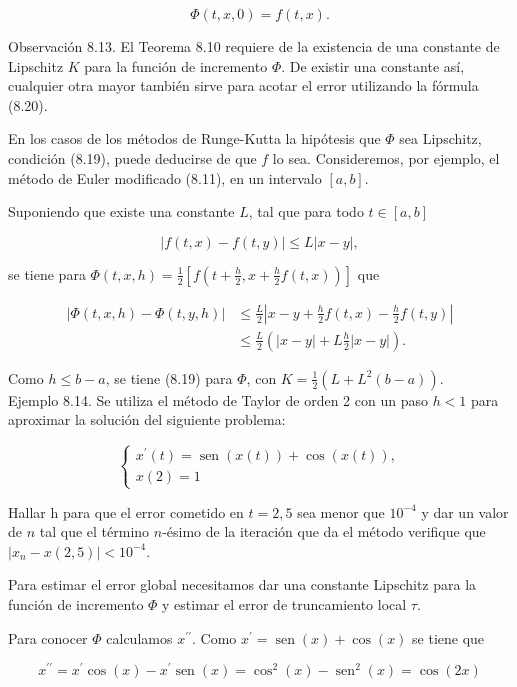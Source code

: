 \documentclass[10pt]{article}
\begin{document}
$$
\Phi(t, x, 0)=f(t, x) .
$$

Observación 8.13. El Teorema 8.10 requiere de la existencia de una constante de Lipschitz $K$ para la función de incremento $\Phi$. De existir una constante así, cualquier otra mayor también sirve para acotar el error utilizando la fórmula (8.20).

En los casos de los métodos de Runge-Kutta la hipótesis que $\Phi$ sea Lipschitz, condición (8.19), puede deducirse de que $f$ lo sea. Consideremos, por ejemplo, el método de Euler modificado (8.11), en un intervalo $[a, b]$.

Suponiendo que existe una constante $L$, tal que para todo $t \in[a, b]$

$$
|f(t, x)-f(t, y)| \leq L|x-y|,
$$

se tiene para $\Phi(t, x, h)=\frac{1}{2}\left[f\left(t+\frac{h}{2}, x+\frac{h}{2} f(t, x)\right)\right]$ que

$$
\begin{aligned}
|\Phi(t, x, h)-\Phi(t, y, h)| & \leq \frac{L}{2}\left|x-y+\frac{h}{2} f(t, x)-\frac{h}{2} f(t, y)\right| \\
& \leq \frac{L}{2}\left(|x-y|+L \frac{h}{2}|x-y|\right) .
\end{aligned}
$$

Como $h \leq b-a$, se tiene (8.19) para $\Phi$, con $K=\frac{1}{2}\left(L+L^{2}(b-a)\right)$.\\
Ejemplo 8.14. Se utiliza el método de Taylor de orden 2 con un paso $h<1$ para aproximar la solución del siguiente problema:

$$
\left\{\begin{array}{l}
x^{\prime}(t)=\operatorname{sen}(x(t))+\cos (x(t)), \\
x(2)=1
\end{array}\right.
$$

Hallar h para que el error cometido en $t=2,5$ sea menor que $10^{-4}$ y dar un valor de $n$ tal que el término $n$-ésimo de la iteración que da el método verifique que $\left|x_{n}-x(2,5)\right|<10^{-4}$.

Para estimar el error global necesitamos dar una constante Lipschitz para la función de incremento $\Phi$ y estimar el error de truncamiento local $\tau$.

Para conocer $\Phi$ calculamos $x^{\prime \prime}$. Como $x^{\prime}=\operatorname{sen}(x)+\cos (x)$ se tiene que

$$
x^{\prime \prime}=x^{\prime} \cos (x)-x^{\prime} \operatorname{sen}(x)=\cos ^{2}(x)-\operatorname{sen}^{2}(x)=\cos (2 x)
$$
\end{document}
